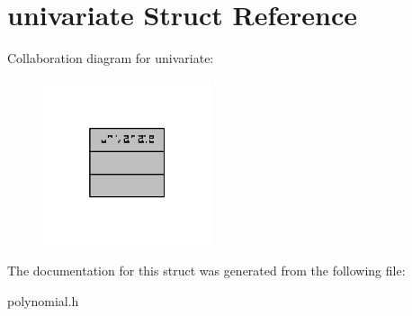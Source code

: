 \hypertarget{structunivariate}{\section{univariate Struct Reference}
\label{structunivariate}
}


Collaboration diagram for univariate\-:
\nopagebreak
\begin{figure}[H]
\begin{center}
\leavevmode
\includegraphics[width=140pt]{structunivariate__coll__graph}
\end{center}
\end{figure}


The documentation for this struct was generated from the following file\-:\begin{DoxyCompactItemize}
\item 
polynomial.\-h\end{DoxyCompactItemize}
